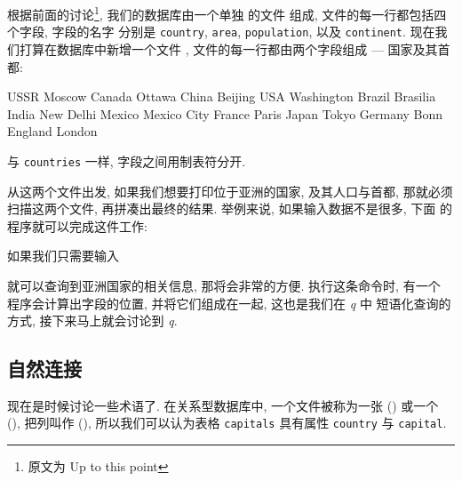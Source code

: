 根据前面的讨论\footnote{原文为 Up to this point}, 我们的数据库由一个单独
的文件  组成, 文件的每一行都包括四个字段, 字段的名字
分别是 \verb'country', \verb'area', \verb'population', 以及
\verb'continent'. 现在我们打算在数据库中新增一个文件 ,
文件的每一行都由两个字段组成 --- 国家及其首都:
\begin{awkcode}
    USSR    Moscow
    Canada  Ottawa
    China   Beijing
    USA     Washington
    Brazil  Brasilia
    India   New Delhi
    Mexico  Mexico City
    France  Paris
    Japan   Tokyo
    Germany Bonn
    England London
\end{awkcode}
与 \verb'countries' 一样, 字段之间用制表符分开.

从这两个文件出发, 如果我们想要打印位于亚洲的国家, 及其人口与首都, 那就必须
扫描这两个文件, 再拼凑出最终的结果. 举例来说, 如果输入数据不是很多, 下面
的程序就可以完成这件工作:

如果我们只需要输入
就可以查询到亚洲国家的相关信息, 那将会非常的方便. 执行这条命令时, 有一个
程序会计算出字段的位置, 并将它们组成在一起, 这也是我们在 \textit{q} 中
短语化查询的方式, 接下来马上就会讨论到 \textit{q}.

\subsection{自然连接}
\label{subsec:natural_joins}

现在是时候讨论一些术语了. 在关系型数据库中, 一个文件被称为一张 
() 或一个  (), 把列叫作 
(), 所以我们可以认为表格 \verb'capitals' 具有属性
\verb'country' 与 \verb'capital'.

